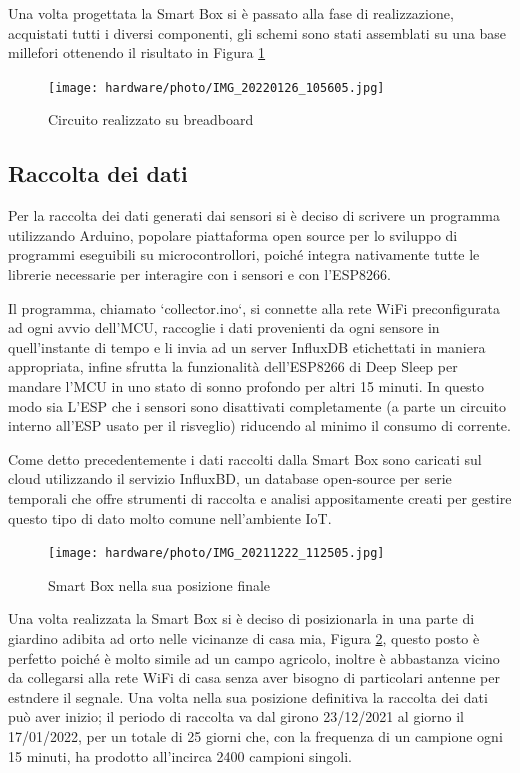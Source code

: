 \documentclass[a4paper, 12pt]{report}
\begin{document}
Una volta progettata la Smart Box si è passato alla fase di realizzazione, acquistati tutti i diversi componenti, gli schemi sono stati assemblati su una base millefori ottenendo il risultato in Figura \ref{fig:assembled}

\begin{figure}[htbp]
\centering
\texttt{[image: hardware/photo/IMG\_20220126\_105605.jpg]}
\caption{Circuito realizzato su breadboard}
\label{fig:assembled}
\end{figure}

\subsection*{Raccolta dei dati}
\vspace{0.5cm}

Per la raccolta dei dati generati dai sensori si è deciso di scrivere un programma utilizzando Arduino, popolare piattaforma open source per lo sviluppo di programmi eseguibili su microcontrollori, poiché 
integra nativamente tutte le librerie necessarie per interagire con i sensori e con l'ESP8266. 

Il programma, chiamato `collector.ino`, si connette alla rete WiFi preconfigurata ad ogni avvio dell'MCU, raccoglie i dati provenienti da ogni sensore in quell'instante di tempo e li invia ad un server InfluxDB 
etichettati in maniera appropriata, infine sfrutta la funzionalità dell'ESP8266 di Deep Sleep per mandare l'MCU in uno stato di sonno profondo per altri 15 minuti. In questo modo sia L'ESP che i sensori sono 
disattivati completamente (a parte un circuito interno all'ESP usato per il risveglio) riducendo al minimo il consumo di corrente.

Come detto precedentemente i dati raccolti dalla Smart Box sono caricati sul cloud utilizzando il servizio InfluxBD, un database open-source per serie temporali che offre strumenti di raccolta e analisi appositamente 
creati per gestire questo tipo di dato molto comune nell'ambiente IoT.

\begin{figure}[htbp]
\centering
\texttt{[image: hardware/photo/IMG\_20211222\_112505.jpg]}
\caption{Smart Box nella sua posizione finale}
\label{fig:inplace}
\end{figure}

Una volta realizzata la Smart Box si è deciso di posizionarla in una parte di giardino adibita ad orto nelle vicinanze di casa mia, Figura \ref{fig:inplace}, questo posto è perfetto poiché è molto simile ad un campo agricolo, 
inoltre è abbastanza vicino da collegarsi alla rete WiFi di casa senza aver bisogno di particolari antenne per estndere il segnale. 
Una volta nella sua posizione definitiva la raccolta dei dati può aver inizio; il periodo di raccolta va dal girono 23/12/2021 al giorno il 17/01/2022, per un totale di 25 giorni che, con la frequenza di un campione 
ogni 15 minuti, ha prodotto all'incirca 2400 campioni singoli.
\end{document}

